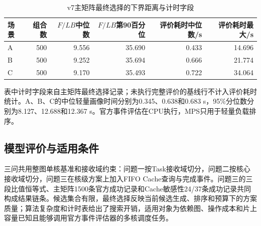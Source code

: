 \begin{table}[H]\centering\small
\caption{v7主矩阵最终选择的下界距离与计时字段}
\label{tab:overall-eval-cost}
\setlength{\tabcolsep}{4pt}
\begin{tabular}{lrrrrr}\toprule
场景 & 组合数 & $F/LB$中位数 & $F/LB$第90百分位 & 评价耗时中位数/s & 评价耗时最大/s\\\midrule
A & 500 & 9.556 & 35.690 & 0.433 & 14.696\\
B & 500 & 9.252 & 35.694 & 0.666 & 21.774\\
C & 500 & 9.170 & 35.493 & 0.722 & 34.064\\\bottomrule
\end{tabular}\end{table}
表中计时字段来自主矩阵最终选择记录；未执行完整评价的基线行不计入评价耗时统计。A、B、C的中位轻量画像时间分别为0.345、0.638和0.683 s，95\%分位数分别为8.127、12.688和12.367 s。官方事件评估在CPU执行，MPS只用于轻量负载排序。

\subsection{模型评价与适用条件}
三问共用整图单核基准和接收域约束：问题一按Task接收域切分，问题二按核心接收域切分，问题三在核级方案上加入FIFO Cache查询与完成事件。问题三的三段比值恒等式、主矩阵1500条官方成功记录和Cache敏感性24/37条成功记录共同构成结果链条。候选集合有限，最终选择反映当前候选生成、排序和预算下的方案质量；算法复杂度和计时表给出了搜索开销，适用对象为依赖图、操作成本和片上容量已知且能够调用官方事件评估器的多核调度任务。
